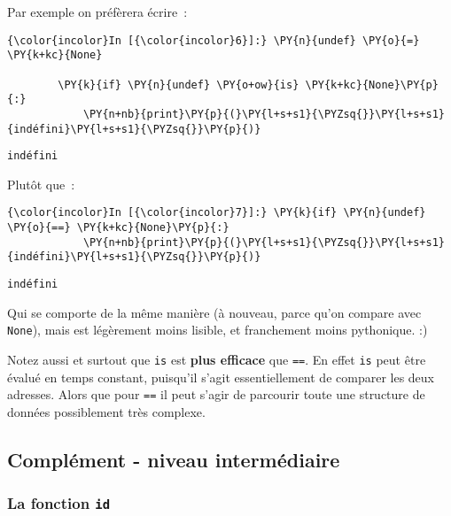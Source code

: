     Par exemple on préfèrera écrire~:

    \begin{Verbatim}[commandchars=\\\{\}]
{\color{incolor}In [{\color{incolor}6}]:} \PY{n}{undef} \PY{o}{=} \PY{k+kc}{None}
        
        \PY{k}{if} \PY{n}{undef} \PY{o+ow}{is} \PY{k+kc}{None}\PY{p}{:}
            \PY{n+nb}{print}\PY{p}{(}\PY{l+s+s1}{\PYZsq{}}\PY{l+s+s1}{indéfini}\PY{l+s+s1}{\PYZsq{}}\PY{p}{)}
\end{Verbatim}


    \begin{Verbatim}[commandchars=\\\{\}]
indéfini

    \end{Verbatim}

    Plutôt que~:

    \begin{Verbatim}[commandchars=\\\{\}]
{\color{incolor}In [{\color{incolor}7}]:} \PY{k}{if} \PY{n}{undef} \PY{o}{==} \PY{k+kc}{None}\PY{p}{:}
            \PY{n+nb}{print}\PY{p}{(}\PY{l+s+s1}{\PYZsq{}}\PY{l+s+s1}{indéfini}\PY{l+s+s1}{\PYZsq{}}\PY{p}{)}
\end{Verbatim}


    \begin{Verbatim}[commandchars=\\\{\}]
indéfini

    \end{Verbatim}

    Qui se comporte de la même manière (à nouveau, parce qu'on compare avec
\texttt{None}), mais est légèrement moins lisible, et franchement moins
pythonique. :)

    Notez aussi et surtout que \texttt{is} est \textbf{plus efficace} que
\texttt{==}. En effet \texttt{is} peut être évalué en temps constant,
puisqu'il s'agit essentiellement de comparer les deux adresses. Alors
que pour \texttt{==} il peut s'agir de parcourir toute une structure de
données possiblement très complexe.

    \hypertarget{compluxe9ment---niveau-intermuxe9diaire}{%
\subsection{Complément - niveau
intermédiaire}\label{compluxe9ment---niveau-intermuxe9diaire}}

    \hypertarget{la-fonction-id}{%
\subsubsection{\texorpdfstring{La fonction
\texttt{id}}{La fonction id}}\label{la-fonction-id}}

